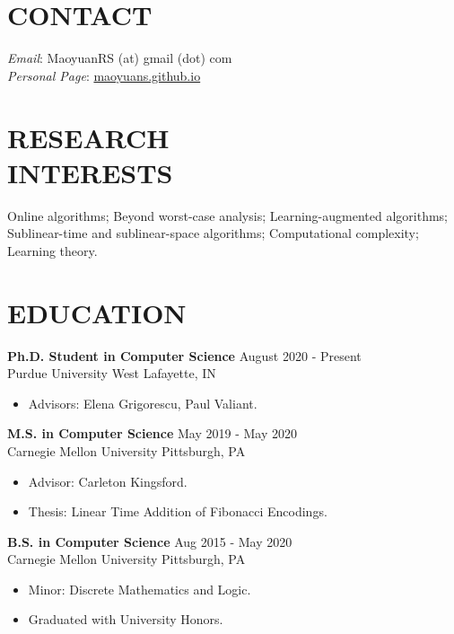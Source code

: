 \documentclass[margin, 10pt]{res} %
\begin{document}
\begin{resume}

\section{CONTACT}
\emph{Email}: MaoyuanRS (at) gmail (dot) com\\
\emph{Personal Page}: \href{https://maoyuans.github.io}{maoyuans.github.io}

 
\section{RESEARCH \\ INTERESTS}  

Online algorithms; Beyond worst-case analysis; Learning-augmented algorithms; Sublinear-time and sublinear-space algorithms; Computational complexity; Learning theory.

 
\section{EDUCATION}

{\bf Ph.D. Student in Computer Science} \hfill August 2020 - Present \\
Purdue University \hfill West Lafayette, IN

\begin{itemize}
\item Advisors: Elena Grigorescu, Paul Valiant.
\end{itemize} 

{\bf M.S. in Computer Science} \hfill May 2019 - May 2020 \\
Carnegie Mellon University \hfill Pittsburgh, PA

\begin{itemize}
\item Advisor: Carleton Kingsford. \hspace{-2em}
\item Thesis: Linear Time Addition of Fibonacci Encodings.
\end{itemize} 

{\bf B.S. in Computer Science} \hfill Aug 2015 - May 2020 \\
Carnegie Mellon University \hfill Pittsburgh, PA

\begin{itemize}
\item Minor: Discrete Mathematics and Logic.
\item Graduated with University Honors.
\end{itemize} 



\end{resume}
\end{document}
